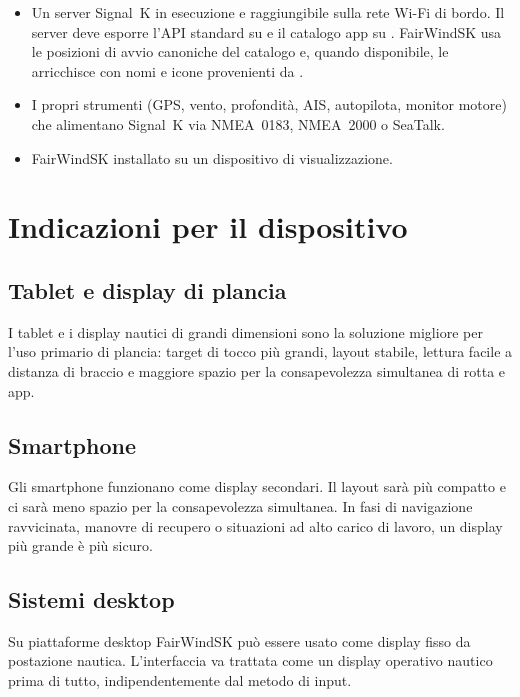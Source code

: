\begin{itemize}
  \item Un server Signal~K in esecuzione e raggiungibile sulla rete Wi-Fi di bordo.
        Il server deve esporre l'API standard su  e il catalogo
        app su . FairWindSK usa le posizioni di
        avvio canoniche del catalogo e, quando disponibile, le arricchisce con nomi
        e icone provenienti da .
  \item I propri strumenti (GPS, vento, profondità, AIS, autopilota, monitor motore)
        che alimentano Signal~K via NMEA~0183, NMEA~2000 o SeaTalk.
  \item FairWindSK installato su un dispositivo di visualizzazione.
\end{itemize}

\section{Indicazioni per il dispositivo}

\subsection{Tablet e display di plancia}

I tablet e i display nautici di grandi dimensioni sono la soluzione migliore per l'uso
primario di plancia: target di tocco più grandi, layout stabile, lettura facile a distanza
di braccio e maggiore spazio per la consapevolezza simultanea di rotta e app.

\subsection{Smartphone}

Gli smartphone funzionano come display secondari. Il layout sarà più compatto e ci sarà
meno spazio per la consapevolezza simultanea. In fasi di navigazione ravvicinata, manovre
di recupero o situazioni ad alto carico di lavoro, un display più grande è più sicuro.

\subsection{Sistemi desktop}

Su piattaforme desktop FairWindSK può essere usato come display fisso da postazione
nautica. L'interfaccia va trattata come un display operativo nautico prima di tutto,
indipendentemente dal metodo di input.

